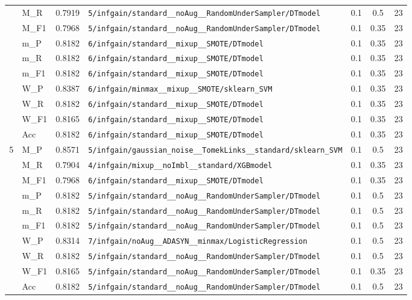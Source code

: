 \begin{table}[htbp]
\begin{tabular}{|c|l|c|>{\ttfamily\footnotesize}p{7.2cm}|c|c|c|}
 & M\_R & 0.7919 & \texttt{5/infgain/standard\_\_noAug\_\_RandomUnderSampler/DTmodel} & 0.1 & 0.5  & 23 \\ 
 & M\_F1 & 0.7968 & \texttt{5/infgain/standard\_\_noAug\_\_RandomUnderSampler/DTmodel} & 0.1 & 0.35  & 23 \\ 
 & m\_P & 0.8182 & \texttt{6/infgain/standard\_\_mixup\_\_SMOTE/DTmodel} & 0.1 & 0.35  & 23 \\ 
 & m\_R & 0.8182 & \texttt{6/infgain/standard\_\_mixup\_\_SMOTE/DTmodel} & 0.1 & 0.35  & 23 \\ 
 & m\_F1 & 0.8182 & \texttt{6/infgain/standard\_\_mixup\_\_SMOTE/DTmodel} & 0.1 & 0.35  & 23 \\ 
 & W\_P & 0.8387 & \texttt{6/infgain/minmax\_\_mixup\_\_SMOTE/sklearn\_SVM} & 0.1 & 0.35  & 23 \\ 
 & W\_R & 0.8182 & \texttt{6/infgain/standard\_\_mixup\_\_SMOTE/DTmodel} & 0.1 & 0.35  & 23 \\ 
 & W\_F1 & 0.8165 & \texttt{6/infgain/standard\_\_mixup\_\_SMOTE/DTmodel} & 0.1 & 0.35  & 23 \\ 
 & Acc & 0.8182 & \texttt{6/infgain/standard\_\_mixup\_\_SMOTE/DTmodel} & 0.1 & 0.35  & 23 \\ 
\hline
\multirow{10}{*}{5} & M\_P & 0.8571 & \texttt{5/infgain/gaussian\_noise\_\_TomekLinks\_\_standard/sklearn\_SVM} & 0.1 & 0.5  & 23 \\ 
 & M\_R & 0.7904 & \texttt{4/infgain/mixup\_\_noImbl\_\_standard/XGBmodel} & 0.1 & 0.35  & 23 \\ 
 & M\_F1 & 0.7968 & \texttt{6/infgain/standard\_\_mixup\_\_SMOTE/DTmodel} & 0.1 & 0.35  & 23 \\ 
 & m\_P & 0.8182 & \texttt{5/infgain/standard\_\_noAug\_\_RandomUnderSampler/DTmodel} & 0.1 & 0.5  & 23 \\ 
 & m\_R & 0.8182 & \texttt{5/infgain/standard\_\_noAug\_\_RandomUnderSampler/DTmodel} & 0.1 & 0.5  & 23 \\ 
 & m\_F1 & 0.8182 & \texttt{5/infgain/standard\_\_noAug\_\_RandomUnderSampler/DTmodel} & 0.1 & 0.5  & 23 \\ 
 & W\_P & 0.8314 & \texttt{7/infgain/noAug\_\_ADASYN\_\_minmax/LogisticRegression} & 0.1 & 0.5  & 23 \\ 
 & W\_R & 0.8182 & \texttt{5/infgain/standard\_\_noAug\_\_RandomUnderSampler/DTmodel} & 0.1 & 0.5  & 23 \\ 
 & W\_F1 & 0.8165 & \texttt{5/infgain/standard\_\_noAug\_\_RandomUnderSampler/DTmodel} & 0.1 & 0.35  & 23 \\ 
 & Acc & 0.8182 & \texttt{5/infgain/standard\_\_noAug\_\_RandomUnderSampler/DTmodel} & 0.1 & 0.5  & 23 \\ 
\hline
\end{tabular}
\end{table}